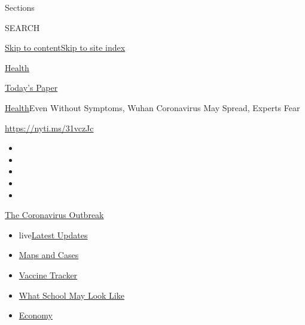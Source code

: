 Sections

SEARCH

\protect\hyperlink{site-content}{Skip to
content}\protect\hyperlink{site-index}{Skip to site index}

\href{https://www.nytimes.com/section/health}{Health}

\href{https://myaccount.nytimes.com/auth/login?response_type=cookie\&client_id=vi}{}

\href{https://www.nytimes.com/section/todayspaper}{Today's Paper}

\href{/section/health}{Health}\textbar{}Even Without Symptoms, Wuhan
Coronavirus May Spread, Experts Fear

\url{https://nyti.ms/31vczJc}

\begin{itemize}
\item
\item
\item
\item
\item
\end{itemize}

\href{https://www.nytimes.com/news-event/coronavirus?action=click\&pgtype=Article\&state=default\&region=TOP_BANNER\&context=storylines_menu}{The
Coronavirus Outbreak}

\begin{itemize}
\tightlist
\item
  live\href{https://www.nytimes.com/2020/08/01/world/coronavirus-covid-19.html?action=click\&pgtype=Article\&state=default\&region=TOP_BANNER\&context=storylines_menu}{Latest
  Updates}
\item
  \href{https://www.nytimes.com/interactive/2020/us/coronavirus-us-cases.html?action=click\&pgtype=Article\&state=default\&region=TOP_BANNER\&context=storylines_menu}{Maps
  and Cases}
\item
  \href{https://www.nytimes.com/interactive/2020/science/coronavirus-vaccine-tracker.html?action=click\&pgtype=Article\&state=default\&region=TOP_BANNER\&context=storylines_menu}{Vaccine
  Tracker}
\item
  \href{https://www.nytimes.com/interactive/2020/07/29/us/schools-reopening-coronavirus.html?action=click\&pgtype=Article\&state=default\&region=TOP_BANNER\&context=storylines_menu}{What
  School May Look Like}
\item
  \href{https://www.nytimes.com/live/2020/07/31/business/stock-market-today-coronavirus?action=click\&pgtype=Article\&state=default\&region=TOP_BANNER\&context=storylines_menu}{Economy}
\end{itemize}

